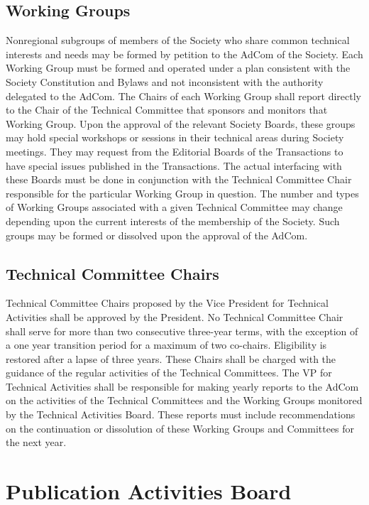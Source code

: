 \documentclass[10pt]{article}
\begin{document}
\subsection{Working Groups}

Nonregional subgroups of members of the Society who share common technical interests and needs may be formed by petition to the AdCom of the Society. Each Working Group must be formed and operated under a plan consistent with the Society Constitution and Bylaws and not inconsistent with the authority delegated to the AdCom. The Chairs of each Working Group shall report directly to the Chair of the Technical Committee that sponsors and monitors that Working Group.  Upon the approval of the relevant Society Boards, these groups may hold special workshops or sessions in their technical areas during Society meetings. They may request from the Editorial Boards of the Transactions to have special issues published in the Transactions. The actual interfacing with these Boards must be done in conjunction with the Technical Committee Chair responsible for the particular Working Group in question. The number and types of Working Groups associated with a given Technical Committee may change depending upon the current interests of the membership of the Society.  Such groups may be formed or dissolved upon the approval of the AdCom.


\subsection{Technical Committee Chairs}

Technical Committee Chairs proposed by the Vice President for Technical Activities shall be approved by the President. No Technical Committee Chair shall serve for more than two consecutive three-year terms, with the exception of a one year transition period for a maximum of two co-chairs. Eligibility is restored after a lapse of three years. These Chairs shall be charged with the guidance of the regular activities of the Technical Committees. The VP for Technical Activities shall be responsible for making yearly reports to the AdCom on the activities of the Technical Committees and the Working Groups monitored by the Technical Activities Board. These reports must include recommendations on the continuation or dissolution of these Working Groups and Committees for the next year.


\section{Publication Activities Board}
\label{PAB}
\end{document}
